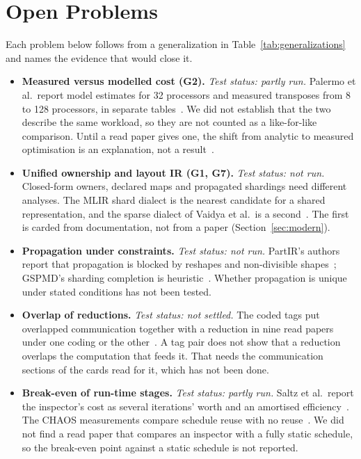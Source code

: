 \section{Open Problems}
\label{sec:open}

Each problem below follows from a generalization in Table~\ref{tab:generalizations} and names the evidence that would close it.

\begin{itemize}[leftmargin=*,nosep]
  \item \textbf{Measured versus modelled cost (G2).} \emph{Test status: partly run.} Palermo et al.\ report model estimates for 32 processors and measured transposes from 8 to 128 processors, in separate tables~\cite{palermo1996dynamic}. We did not establish that the two describe the same workload, so they are not counted as a like-for-like comparison. Until a read paper gives one, the shift from analytic to measured optimisation is an explanation, not a result~\cite{gupta1992automatic,jia2019flexflow}.
  \item \textbf{Unified ownership and layout IR (G1, G7).} \emph{Test status: not run.} Closed-form owners, declared maps and propagated shardings need different analyses. The MLIR shard dialect is the nearest candidate for a shared representation, and the sparse dialect of Vaidya et al.\ is a second~\cite{mlir2025shard,vaidya2025distributed}. The first is carded from documentation, not from a paper (Section~\ref{sec:modern}).
  \item \textbf{Propagation under constraints.} \emph{Test status: not run.} PartIR's authors report that propagation is blocked by reshapes and non-divisible shapes~\cite{alabed2025partir}; GSPMD's sharding completion is heuristic~\cite{xu2021gspmd}. Whether propagation is unique under stated conditions has not been tested.
  \item \textbf{Overlap of reductions.} \emph{Test status: not settled.} The coded tags put overlapped communication together with a reduction in nine read papers under one coding or the other~\cite{benkner1999compiling,kung1982systolic,hiranandani1992evaluation,rogers1994compiling,gupta1995hpf,narayanan2019pipedream,yadav2022distal,rocki2020cerebras,yelick2007titanium}. A tag pair does not show that a reduction overlaps the computation that feeds it. That needs the communication sections of the cards read for it, which has not been done.
  \item \textbf{Break-even of run-time stages.} \emph{Test status: partly run.} Saltz et al.\ report the inspector's cost as several iterations' worth and an amortised efficiency~\cite{saltz1991multiprocessor}. The CHAOS measurements compare schedule reuse with no reuse~\cite{ponnusamy1995runtime}. We did not find a read paper that compares an inspector with a fully static schedule, so the break-even point against a static schedule is not reported.

\end{itemize}
